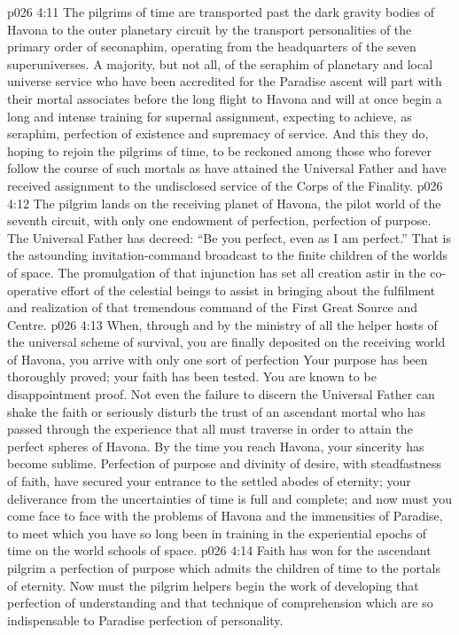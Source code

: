 \vs p026 4:11 The pilgrims of time are transported past the dark gravity bodies of Havona to the outer planetary circuit by the transport personalities of the primary order of seconaphim, operating from the headquarters of the seven superuniverses. A majority, but not all, of the seraphim of planetary and local universe service who have been accredited for the Paradise ascent will part with their mortal associates before the long flight to Havona and will at once begin a long and intense training for supernal assignment, expecting to achieve, as seraphim, perfection of existence and supremacy of service. And this they do, hoping to rejoin the pilgrims of time, to be reckoned among those who forever follow the course of such mortals as have attained the Universal Father and have received assignment to the undisclosed service of the Corps of the Finality.
\vs p026 4:12 The pilgrim lands on the receiving planet of Havona, the pilot world of the seventh circuit, with only one endowment of perfection, perfection of purpose. The Universal Father has decreed: “Be you perfect, even as I am perfect.” That is the astounding invitation\hyp{}command broadcast to the finite children of the worlds of space. The promulgation of that injunction has set all creation astir in the co\hyp{}operative effort of the celestial beings to assist in bringing about the fulfilment and realization of that tremendous command of the First Great Source and Centre.
\vs p026 4:13 When, through and by the ministry of all the helper hosts of the universal scheme of survival, you are finally deposited on the receiving world of Havona, you arrive with only one sort of perfection  Your purpose has been thoroughly proved; your faith has been tested. You are known to be disappointment proof. Not even the failure to discern the Universal Father can shake the faith or seriously disturb the trust of an ascendant mortal who has passed through the experience that all must traverse in order to attain the perfect spheres of Havona. By the time you reach Havona, your sincerity has become sublime. Perfection of purpose and divinity of desire, with steadfastness of faith, have secured your entrance to the settled abodes of eternity; your deliverance from the uncertainties of time is full and complete; and now must you come face to face with the problems of Havona and the immensities of Paradise, to meet which you have so long been in training in the experiential epochs of time on the world schools of space.
\vs p026 4:14 Faith has won for the ascendant pilgrim a perfection of purpose which admits the children of time to the portals of eternity. Now must the pilgrim helpers begin the work of developing that perfection of understanding and that technique of comprehension which are so indispensable to Paradise perfection of personality.
